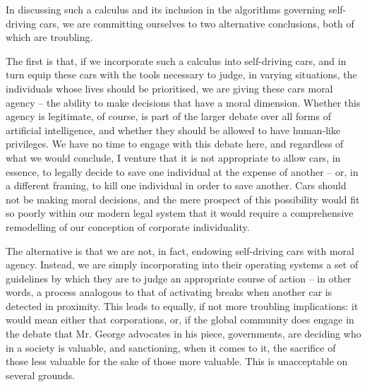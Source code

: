    In discussing such a calculus and its inclusion in the algorithms
   governing self-driving cars, we are committing ourselves to two
   alternative conclusions, both of which are troubling.

   The first is that, if we incorporate such a calculus into self-driving
   cars, and in turn equip these cars with the tools necessary to judge,
   in varying situations, the individuals whose lives should be
   prioritised, we are giving these cars moral agency -- the ability to
   make decisions that have a moral dimension. Whether this agency is
   legitimate, of course, is part of the larger debate over all forms of
   artificial intelligence, and whether they should be allowed to have
   human-like privileges. We have no time to engage with this debate here,
   and regardless of what we would conclude, I venture that it is not
   appropriate to allow cars, in essence, to legally decide to save one
   individual at the expense of another -- or, in a different framing, to
   kill one individual in order to save another. Cars should not be making
   moral decisions, and the mere prospect of this possibility would fit so
   poorly within our modern legal system that it would require a
   comprehensive remodelling of our conception of corporate
   individuality.

   The alternative is that we are not, in fact, endowing self-driving cars
   with moral agency. Instead, we are simply incorporating into their
   operating systems a set of guidelines by which they are to judge an
   appropriate course of action -- in other words, a process analogous to
   that of activating breaks when another car is detected in proximity.
   This leads to equally, if not more troubling implications: it would
   mean either that corporations, or, if the global community does engage
   in the debate that Mr. George advocates in his piece, governments, are
   deciding who in a society is valuable, and sanctioning, when it comes
   to it, the sacrifice of those less valuable for the sake of those more
   valuable. This is unacceptable on several grounds.


